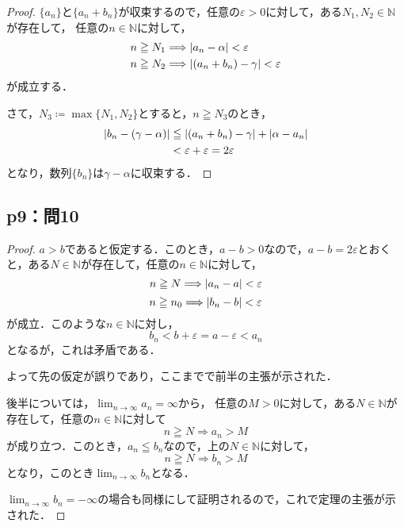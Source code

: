 \documentclass[uplatex,dvipdfmx,a4paper,10pt,fleqn]{jsarticle}
\newenvironment{tleftbar}{\begin{tbleftline}\setlength{\parindent}{1zw}}{\end{tbleftline}}
\begin{document}
    \begin{tleftbar}
        \begin{proof}
        $\{ a_n \}$と$ \{ a_n + b_n \}$が収束するので，任意の$\varepsilon >0$に対して，ある$N_1 , N_2 \in \mathbb{N}$が存在して，
        任意の$n \in \mathbb{N}$に対して，
        \begin{align*} 
            &n \geqq N_1 \Longrightarrow \abs{a_n - \alpha}<\varepsilon \\
            & n \geqq N_2 \Longrightarrow \abs{(a_n + b_n)-\gamma}<\varepsilon 
        \end{align*} 
        が成立する．

        さて，$N_3 \coloneqq \max \{ N_1 , N_2 \}$とすると，$n \geqq N_3$のとき，
        \begin{align*} 
            \abs{b_n - (\gamma - \alpha )} & \leqq  \abs{(a_n+b_n)-\gamma} + \abs{\alpha - a_n} \\
            & < \varepsilon + \varepsilon = 2 \varepsilon 
        \end{align*}
        となり，数列$\{b_n \}$は$\gamma - \alpha $に収束する．
    \end{proof}
    \end{tleftbar}

        \subsection*{p9：問10}
    

\begin{tleftbar}
    \begin{proof}
        $a>b$であると仮定する．このとき，$a-b >0$なので，$a-b=2 \varepsilon$とおくと，ある$N \in \mathbb{N}$が存在して，任意の$n \in \mathbb{N}$に対して，
        \[
            n \geqq N \Longrightarrow \abs{a_n -a} < \varepsilon
        \]
        \[
            n \geqq n_0 \Longrightarrow \abs{b_n -b} <\varepsilon
        \]
        が成立．このような$n \in \mathbb{N}$に対し，
        \[
            b_n< b+\varepsilon = a-\varepsilon < a_n
        \]
        となるが，これは矛盾である．
        
        よって先の仮定が誤りであり，ここまでで前半の主張が示された．

        後半については，$\lim_{n \to \infty} a_n = \infty$から，
        任意の$M >0$に対して，ある$N \in \mathbb{N}$が存在して，任意の$n \in \mathbb{N}$に対して
        \[
            n \geqq N \Longrightarrow a_n >M 
        \]
        が成り立つ．このとき，$a_n \leqq b_n$なので，上の$N\in \mathbb{N}$に対して，
        \[
            n \geqq N \Longrightarrow b_n >M
        \]
        となり，このとき$\lim_{n \to \infty} b_n $となる．

        $\lim_{n \to \infty} b_n = -\infty$の場合も同様にして証明されるので，これで定理の主張が示された．
    \end{proof}
    \end{tleftbar}
\end{document}
